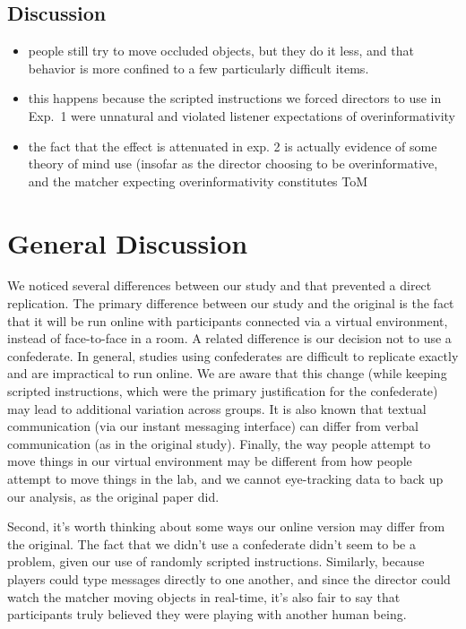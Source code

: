 \documentclass[10pt,letterpaper]{article}
\begin{document}
\subsection{Discussion}

\begin{itemize}
\item people still try to move occluded objects, but they do it less, and that behavior is more confined to a few particularly difficult items.
\item this happens because the scripted instructions we forced directors to use in Exp.~1 were unnatural and violated listener expectations of overinformativity
\item the fact that the effect is attenuated in exp. 2 is actually evidence of some theory of mind use (insofar as the director choosing to be overinformative, and the matcher expecting overinformativity constitutes ToM
\end{itemize}

\section{General Discussion}

We noticed several differences between our study and  that prevented a direct replication. The primary difference between our study and the original is the fact that it will be run online with participants connected via a virtual environment, instead of face-to-face in a room. A related difference is our decision not to use a confederate. In general, studies using confederates are difficult to replicate exactly and are impractical to run online. We are aware that this change (while keeping scripted instructions, which were the primary justification for the confederate) may lead to additional variation across groups. It is also known that textual communication (via our instant messaging interface) can differ from verbal communication (as in the original study). Finally, the way people attempt to move things in our virtual environment may be different from how people attempt to move things in the lab, and we cannot eye-tracking data to back up our analysis, as the original paper did.

Second, it's worth thinking about some ways our online version may differ from the original. The fact that we didn't use a confederate didn't seem to be a problem, given our use of randomly scripted instructions. Similarly, because players could type messages directly to one another, and since the director could watch the matcher moving objects in real-time, it's also fair to say that participants truly believed they were playing with another human being. 
\end{document}
